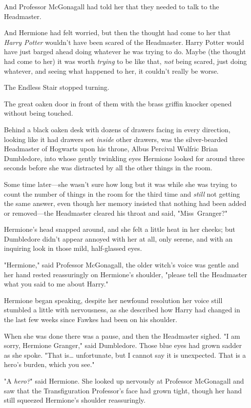 And Professor McGonagall had told her that they needed to talk to the
Headmaster.

And Hermione had felt worried, but then the thought had come to her that
\emph{Harry Potter} wouldn't have been scared of the Headmaster. Harry Potter
would have just barged ahead doing whatever he was trying to do. Maybe (the
thought had come to her) it was worth \emph{trying} to be like that, \emph{not}
being scared, just doing whatever, and seeing what happened to her, it couldn't
really be worse.

The Endless Stair stopped turning.

The great oaken door in front of them with the brass griffin knocker opened
without being touched.

Behind a black oaken desk with dozens of drawers facing in every direction,
looking like it had drawers set \emph{inside} other drawers, was the
silver-bearded Headmaster of Hogwarts upon his throne, Albus Percival Wulfric
Brian Dumbledore, into whose gently twinkling eyes Hermione looked for around
three seconds before she was distracted by all the other things in the room.

Some time later---she wasn't sure how long but it was while she was trying to
count the number of things in the room for the third time and \emph{still} not
getting the same answer, even though her memory insisted that nothing had been
added or removed---the Headmaster cleared his throat and said, "Miss~Granger?"

Hermione's head snapped around, and she felt a little heat in her cheeks; but
Dumbledore didn't appear annoyed with her at all, only serene, and with an
inquiring look in those mild, half-glassed eyes.

"Hermione," said Professor McGonagall, the older witch's voice was gentle and
her hand rested reassuringly on Hermione's shoulder, "please tell the
Headmaster what you said to me about Harry."

Hermione began speaking, despite her newfound resolution her voice still
stumbled a little with nervousness, as she described how Harry had changed in
the last few weeks since Fawkes had been on his shoulder.

When she was done there was a pause, and then the Headmaster sighed. "I am
sorry, Hermione Granger," said Dumbledore. Those blue eyes had grown sadder as
she spoke. "That is{\ldots} unfortunate, but I cannot say it is unexpected.
That is a hero's burden, which you see."

"A \emph{hero?}" said Hermione. She looked up nervously at Professor McGonagall
and saw that the Transfiguration Professor's face had grown tight, though her
hand still squeezed Hermione's shoulder reassuringly.

